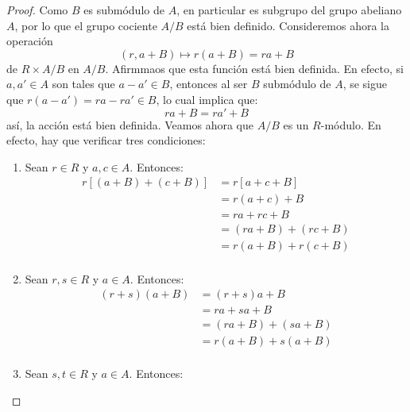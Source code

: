 \documentclass[12pt]{report}
\newcounter{it}
\theoremstyle{largebreak}
\begin{document}
    \begin{proof}
        Como $B$ es submódulo de $A$, en particular es subgrupo del grupo abeliano $A$, por lo que el grupo cociente $A/B$ está bien definido. Consideremos ahora la operación
        \begin{equation*}
            (r,a+B)\mapsto r(a+B)=ra+B
        \end{equation*}
        de $R\times A/B$ en $A/B$. Afirmmaos que esta función está bien definida. En efecto, si $a,a'\in A$ son tales que $a-a'\in B$, entonces al ser $B$ submódulo de $A$, se sigue que $r(a-a')=ra-ra'\in B$, lo cual implica que:
        \begin{equation*}
            ra+B=ra'+B
        \end{equation*}
        así, la acción está bien definida. Veamos ahora que $A/B$ es un $R$-módulo. En efecto, hay que verificar tres condiciones:
        \begin{enumerate}[label = \textit{(\alph*)}]
            \item Sean $r\in R$ y $a,c\in A$. Entonces:
            \begin{equation*}
                \begin{split}
                    r\left[\left(a+B \right)+\left(c+B \right)\right]&=r\left[a+c+B \right]\\
                    &=r(a+c)+B\\
                    &=ra+rc+B\\
                    &=(ra+B)+(rc+B)\\
                    &=r(a+B)+r(c+B)\\
                \end{split}
            \end{equation*}
            \item Sean $r,s\in R$ y $a\in A$. Entonces:
            \begin{equation*}
                \begin{split}
                    (r+s)(a+B)&=(r+s)a+B \\
                    &=ra+sa+B\\
                    &=(ra+B)+(sa+B)\\
                    &=r(a+B)+s(a+B)\\
                \end{split}
            \end{equation*}
            \item Sean $s,t\in R$ y $a\in A$. Entonces:
            \begin{equation*}

\end{equation*}
\end{enumerate}
\end{proof}
\end{document}
